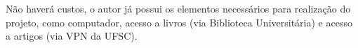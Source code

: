 Não haverá custos, o autor já possui os elementos necessários para realização do projeto, como computador, acesso a livros (via Biblioteca Universitária) e acesso a artigos (via VPN da UFSC).